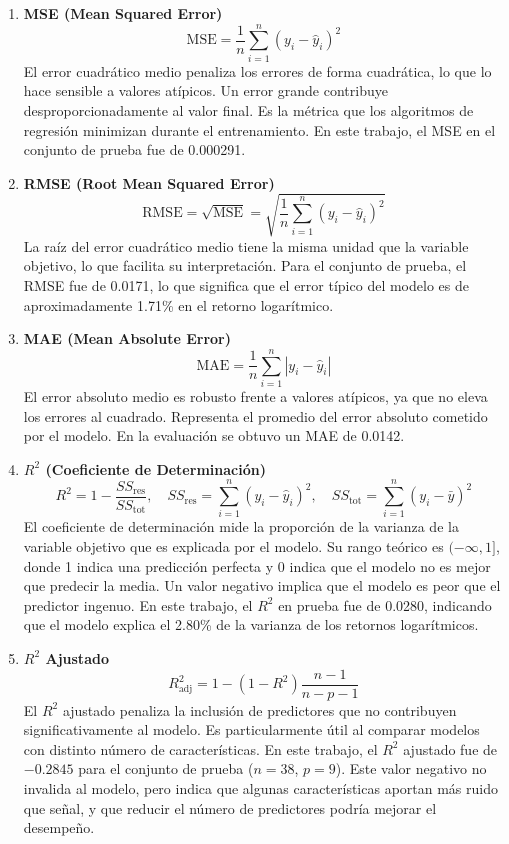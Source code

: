 \documentclass[12pt,a4paper]{article}
\begin{document}
\begin{enumerate}[leftmargin=*,labelindent=0em]

    \item \textbf{MSE (Mean Squared Error)} \[
    \text{MSE} = \frac{1}{n}\sum_{i=1}^{n}(y_i - \hat{y}_i)^2
    \]
    El error cuadrático medio penaliza los errores de forma cuadrática, lo que lo hace sensible a valores atípicos. Un error grande contribuye desproporcionadamente al valor final. Es la métrica que los algoritmos de regresión minimizan durante el entrenamiento. En este trabajo, el MSE en el conjunto de prueba fue de 0.000291.

    \item \textbf{RMSE (Root Mean Squared Error)} \[
    \text{RMSE} = \sqrt{\text{MSE}} = \sqrt{\frac{1}{n}\sum_{i=1}^{n}(y_i - \hat{y}_i)^2}
    \]
    La raíz del error cuadrático medio tiene la misma unidad que la variable objetivo, lo que facilita su interpretación. Para el conjunto de prueba, el RMSE fue de 0.0171, lo que significa que el error típico del modelo es de aproximadamente 1.71\% en el retorno logarítmico.

    \item \textbf{MAE (Mean Absolute Error)} \[
    \text{MAE} = \frac{1}{n}\sum_{i=1}^{n}|y_i - \hat{y}_i|
    \]
    El error absoluto medio es robusto frente a valores atípicos, ya que no eleva los errores al cuadrado. Representa el promedio del error absoluto cometido por el modelo. En la evaluación se obtuvo un MAE de 0.0142.

    \item \textbf{$R^{2}$ (Coeficiente de Determinación)} \[
    R^{2} = 1 - \frac{SS_{\text{res}}}{SS_{\text{tot}}}, \quad SS_{\text{res}} = \sum_{i=1}^{n}(y_i - \hat{y}_i)^2, \quad SS_{\text{tot}} = \sum_{i=1}^{n}(y_i - \bar{y})^2
    \]
    El coeficiente de determinación mide la proporción de la varianza de la variable objetivo que es explicada por el modelo. Su rango teórico es $(-\infty, 1]$, donde 1 indica una predicción perfecta y 0 indica que el modelo no es mejor que predecir la media. Un valor negativo implica que el modelo es peor que el predictor ingenuo. En este trabajo, el $R^{2}$ en prueba fue de 0.0280, indicando que el modelo explica el 2.80\% de la varianza de los retornos logarítmicos.

    \item \textbf{$R^{2}$ Ajustado} \[
    R^{2}_{\text{adj}} = 1 - (1 - R^{2})\frac{n-1}{n-p-1}
    \]
    El $R^{2}$ ajustado penaliza la inclusión de predictores que no contribuyen significativamente al modelo. Es particularmente útil al comparar modelos con distinto número de características. En este trabajo, el $R^{2}$ ajustado fue de $-0.2845$ para el conjunto de prueba ($n=38$, $p=9$). Este valor negativo no invalida al modelo, pero indica que algunas características aportan más ruido que señal, y que reducir el número de predictores podría mejorar el desempeño.


\end{enumerate}
\end{document}
